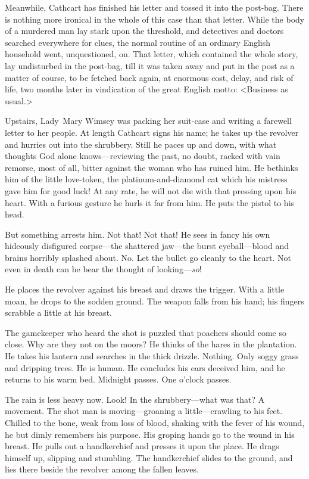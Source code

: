 \begin{dialogue}
Meanwhile, Cathcart has finished his letter and tossed it into the post-bag. There is nothing more ironical in the whole of this case than that letter. While the body of a murdered man lay stark upon the threshold, and detectives and doctors searched everywhere for clues, the normal routine of an ordinary English household went, unquestioned, on. That letter, which contained the whole story, lay undisturbed in the post-bag, till it was taken away and put in the post as a matter of course, to be fetched back again, at enormous cost, delay, and risk of life, two months later in vindication of the great English motto: <Business as usual.>



Upstairs, Lady~Mary Wimsey was packing her suit-case and writing a farewell letter to her people. At length Cathcart signs his name; he takes up the revolver and hurries out into the shrubbery. Still he paces up and down, with what thoughts God alone knows—reviewing the past, no doubt, racked with vain remorse, most of all, bitter against the woman who has ruined him. He bethinks him of the little love-token, the platinum-and-diamond cat which his mistress gave him for good luck! At any rate, he will not die with that pressing upon his heart. With a furious gesture he hurls it far from him. He puts the pistol to his head.



But something arrests him. Not that! Not that! He sees in fancy his own hideously disfigured corpse—the shattered jaw—the burst eyeball—blood and brains horribly splashed about. No. Let the bullet go cleanly to the heart. Not even in death can he bear the thought of looking—\emph{so}!



He places the revolver against his breast and draws the trigger. With a little moan, he drops to the sodden ground. The weapon falls from his hand; his fingers scrabble a little at his breast.



The gamekeeper who heard the shot is puzzled that poachers should come so close. Why are they not on the moors? He thinks of the hares in the plantation. He takes his lantern and searches in the thick drizzle. Nothing. Only soggy grass and dripping trees. He is human. He concludes his ears deceived him, and he returns to his warm bed. Midnight passes. One o'clock passes.



The rain is less heavy now. Look! In the shrubbery—what was that? A movement. The shot man is moving—groaning a little—crawling to his feet. Chilled to the bone, weak from loss of blood, shaking with the fever of his wound, he but dimly remembers his purpose. His groping hands go to the wound in his breast. He pulls out a handkerchief and presses it upon the place. He drags himself up, slipping and stumbling. The handkerchief slides to the ground, and lies there beside the revolver among the fallen leaves.




\end{dialogue}
